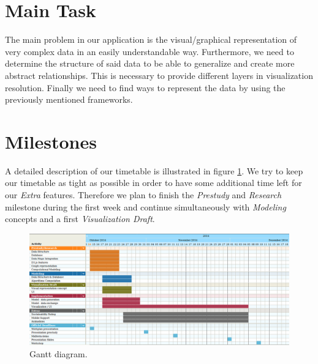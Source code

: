 \documentclass[a4page]{article}
\begin{document}
\section{Main Task}
The main problem in our application is the visual/graphical representation of very complex data in an easily understandable way.
Furthermore, we need to determine the structure of said data to be able to generalize and create more abstract relationships.
This is necessary to provide different layers in visualization resolution.
Finally we need to find ways to represent the data by using the previously mentioned frameworks.

\section{Milestones}

A detailed description of our timetable is illustrated in figure \ref{fig:gant-diagram}. We try to keep our timetable as tight as possible in order to have some additional time left for our \textit{Extra} features. Therefore we plan to finish the \textit{Prestudy} and \textit{Research} milestone during the first week and continue simultaneously with \textit{Modeling} concepts and a first \textit{Visualization Draft}. 

\begin{figure}[ht]
 \centering
 \includegraphics[scale=0.5]{gantt.png}
 \caption{Gantt diagram.}
 \label{fig:gant-diagram}
\end{figure}




\end{document}
